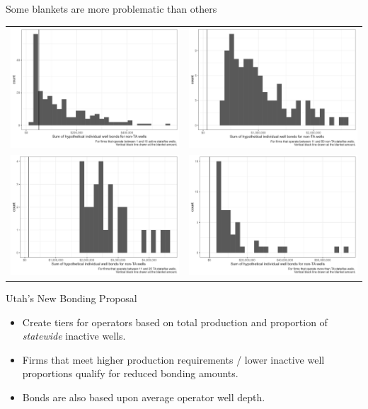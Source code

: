 \documentclass{beamer}
\begin{document}
\begin{frame}{Some blankets are more problematic than others}
\vspace{-1cm}
\begin{tabular}{cc}
    \includegraphics[width=0.45\linewidth]{Figures/Histogram_nonTA_1_10.jpg} & \includegraphics[width=0.45\linewidth]{Figures/Histogram_nonTA_11_50.jpg} \\
     \includegraphics[width=0.45\linewidth]{Figures/Histogram_nonTA_51_100.jpg}& \includegraphics[width=0.45\linewidth]{Figures/Histogram_nonTA_100.jpg}
\end{tabular}
\end{frame}

\begin{frame}{Utah's New Bonding Proposal}
    \begin{itemize}
        \item Create tiers for operators based on total production and proportion of \textit{statewide} inactive wells.
        \item Firms that meet higher production requirements / lower inactive well proportions qualify for reduced bonding amounts.
        \item Bonds are also based upon average operator well depth.
        
    \end{itemize}
\end{frame}
\end{document}
